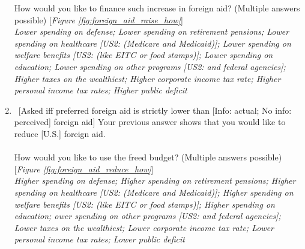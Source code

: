 \begin{enumerate}[resume]
  How would you like to finance such increase in foreign aid? (Multiple answers possible) [\textit{Figure \ref{fig:foreign_aid_raise_how}}]
  \\ \textit{Lower spending on defense; Lower spending on retirement pensions; Lower spending on healthcare [US2: (Medicare and Medicaid)]; Lower spending on welfare benefits [US2: (like EITC or food stamps)]; Lower spending on education; Lower spending on other programs [US2: and federal agencies]; Higher taxes on the wealthiest; Higher corporate income tax rate; Higher personal income tax rates; Higher public deficit}
  \item \label{q:foreign_aid_reduce_how} ~[Asked iff preferred foreign aid is strictly lower than [Info: actual; No info: perceived] foreign aid] Your previous answer shows that you would like to reduce [U.S.] foreign aid.\\
\\
  How would you like to use the freed budget? (Multiple answers possible) [\textit{Figure \ref{fig:foreign_aid_reduce_how}}]
  \\ \textit{Higher spending on defense; Higher spending on retirement pensions; Higher spending on healthcare [US2: (Medicare and Medicaid)]; Higher spending on welfare benefits [US2: (like EITC or food stamps)]; Higher spending on education; ower spending on other programs [US2: and federal agencies]; Lower taxes on the wealthiest; Lower corporate income tax rate; Lower personal income tax rates; Lower public deficit}
\end{enumerate}

